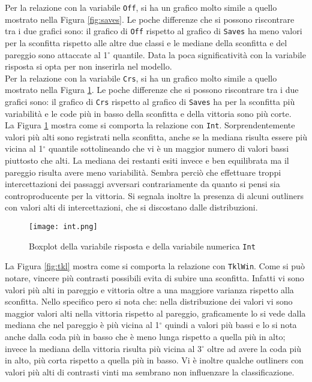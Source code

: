 Per la relazione con la variabile \texttt{Off}, si ha un grafico molto simile a quello mostrato nella Figura \ref{fig:saves}. Le poche differenze che si possono riscontrare tra i due grafici sono: il grafico di \texttt{Off} rispetto al grafico di \texttt{Saves} ha meno valori per la sconfitta rispetto alle altre due classi e le mediane della sconfitta e del pareggio sono attaccate al 1$^{\circ}$ quantile. Data la poca significatività con la variabile risposta si opta per non inserirla nel modello.\\

Per la relazione con la variabile \texttt{Crs}, si ha un grafico molto simile a quello mostrato nella Figura \ref{fig:int}. Le poche differenze che si possono riscontrare tra i due grafici sono: il grafico di \texttt{Crs} rispetto al grafico di \texttt{Saves} ha per la sconfitta più variabilità e le code più in basso della sconfitta e della vittoria sono più corte.\\

La Figura \ref{fig:int} mostra come si comporta la relazione con \texttt{Int}. Sorprendentemente valori più alti sono registrati nella sconfitta, anche se la mediana risulta essere più vicina al 1$^{\circ}$ quantile sottolineando che vi è un maggior numero di valori bassi piuttosto che alti. La mediana dei restanti esiti invece e ben equilibrata ma il pareggio risulta avere meno variabilità. Sembra perciò che effettuare troppi intercettazioni dei passaggi avversari contrariamente da quanto si pensi sia controproducente per la vittoria. Si segnala inoltre la presenza di alcuni outliners con valori alti di intercettazioni, che si discostano dalle distribuzioni.\\

\begin{figure}[htbp]
	\begin{center}
		\texttt{[image: int.png]}
		\caption{Boxplot della variabile risposta e della variabile numerica \texttt{Int}} \label{fig:int}
	\end{center}
\end{figure}

La Figura \ref{fig:tkl} mostra come si comporta la relazione con \texttt{TklWin}. Come si può notare, vincere più contrasti possibili evita di subire una sconfitta. Infatti vi sono valori più alti in pareggio e vittoria oltre a una maggiore varianza rispetto alla sconfitta. Nello specifico pero si nota che: nella distribuzione dei valori vi sono maggior valori alti nella vittoria rispetto al pareggio, graficamente lo si vede dalla mediana che nel pareggio è più vicina al 1$^{\circ}$ quindi a valori più bassi e lo si nota anche dalla coda più in basso che è meno lunga rispetto a quella più in alto; invece la mediana della vittoria risulta più vicina al 3$^{\circ}$ oltre ad avere la coda più in alto, più corta rispetto a quella più in basso. Vi è inoltre qualche outliners con valori più alti di contrasti vinti ma sembrano non influenzare la classificazione.\\

